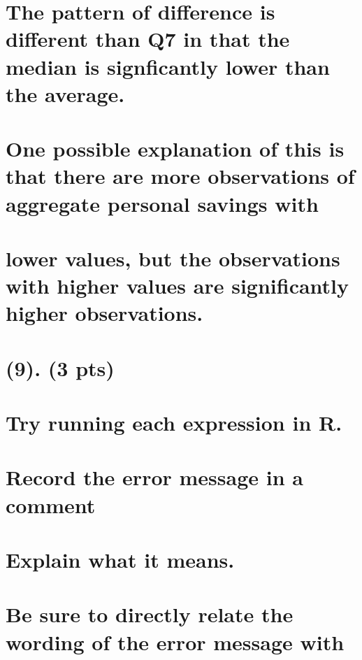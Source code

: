 \documentclass[]{article}
\begin{document}
\section{The pattern of difference is different than Q7 in that the
median is signficantly lower than the
average.}\label{the-pattern-of-difference-is-different-than-q7-in-that-the-median-is-signficantly-lower-than-the-average.}

\section{One possible explanation of this is that there are more
observations of aggregate personal savings
with}\label{one-possible-explanation-of-this-is-that-there-are-more-observations-of-aggregate-personal-savings-with}

\section{lower values, but the observations with higher values are
significantly higher
observations.}\label{lower-values-but-the-observations-with-higher-values-are-significantly-higher-observations.}

\section{(9). (3 pts)}\label{pts}

\section{Try running each expression in
R.}\label{try-running-each-expression-in-r.}

\section{Record the error message in a
comment}\label{record-the-error-message-in-a-comment}

\section{Explain what it means.}\label{explain-what-it-means.}

\section{Be sure to directly relate the wording of the error message
with}\label{be-sure-to-directly-relate-the-wording-of-the-error-message-with}
\end{document}
